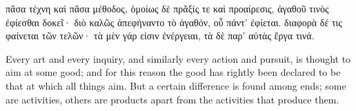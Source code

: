 \documentclass[11pt]{article}
\begin{document}
\begin{pages}

\begin{Leftside}
\beginnumbering
\pstart
\textgreek{πᾶσα τέχνη καὶ πᾶσα μέθοδος, ὁμοίως δὲ πρᾶξίς τε καὶ προαίρεσις,
ἀγαθοῦ τινὸς ἐφίεσθαι δοκεῖ· διὸ καλῶς ἀπεφήναντο
τὸ ἀγαθόν, οὗ πάντ\textquoteright{} ἐφίεται.}
\pend
\pstart
\textgreek{διαφορὰ δέ τις φαίνεται τῶν τελῶν· τὰ μὲν γάρ εἰσιν ἐνέργειαι,
τὰ δὲ παρ\textquoteright{} αὐτὰς ἔργα τινά.}
\pend
\endnumbering
\end{Leftside}

\begin{Rightside}
\beginnumbering
\pstart
Every art and every inquiry, and similarly every action and pursuit, is
thought to aim at some good; and for this reason the
good has rightly been declared to be that at which all things aim.
\pend
\pstart
But a certain difference is found among ends; some are activities, others
are products apart from the activities that produce them.
\pend
\endnumbering
\end{Rightside}

\end{pages}
\Pages   %
\end{document}
